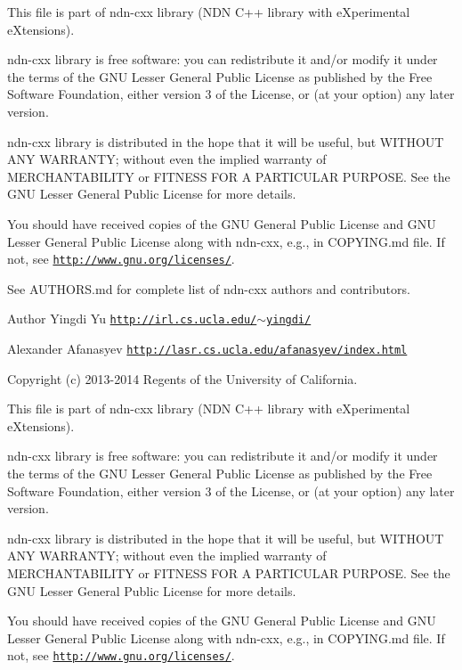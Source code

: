This file is part of ndn-\/cxx library (N\+DN C++ library with e\+Xperimental e\+Xtensions).

ndn-\/cxx library is free software\+: you can redistribute it and/or modify it under the terms of the G\+NU Lesser General Public License as published by the Free Software Foundation, either version 3 of the License, or (at your option) any later version.

ndn-\/cxx library is distributed in the hope that it will be useful, but W\+I\+T\+H\+O\+UT A\+NY W\+A\+R\+R\+A\+N\+TY; without even the implied warranty of M\+E\+R\+C\+H\+A\+N\+T\+A\+B\+I\+L\+I\+TY or F\+I\+T\+N\+E\+SS F\+OR A P\+A\+R\+T\+I\+C\+U\+L\+AR P\+U\+R\+P\+O\+SE. See the G\+NU Lesser General Public License for more details.

You should have received copies of the G\+NU General Public License and G\+NU Lesser General Public License along with ndn-\/cxx, e.\+g., in C\+O\+P\+Y\+I\+N\+G.\+md file. If not, see \href{http://www.gnu.org/licenses/}{\tt http\+://www.\+gnu.\+org/licenses/}.

See A\+U\+T\+H\+O\+R\+S.\+md for complete list of ndn-\/cxx authors and contributors.

\begin{DoxyAuthor}{Author}
Yingdi Yu \href{http://irl.cs.ucla.edu/~yingdi/}{\tt http\+://irl.\+cs.\+ucla.\+edu/$\sim$yingdi/} 

Alexander Afanasyev \href{http://lasr.cs.ucla.edu/afanasyev/index.html}{\tt http\+://lasr.\+cs.\+ucla.\+edu/afanasyev/index.\+html}
\end{DoxyAuthor}
Copyright (c) 2013-\/2014 Regents of the University of California.

This file is part of ndn-\/cxx library (N\+DN C++ library with e\+Xperimental e\+Xtensions).

ndn-\/cxx library is free software\+: you can redistribute it and/or modify it under the terms of the G\+NU Lesser General Public License as published by the Free Software Foundation, either version 3 of the License, or (at your option) any later version.

ndn-\/cxx library is distributed in the hope that it will be useful, but W\+I\+T\+H\+O\+UT A\+NY W\+A\+R\+R\+A\+N\+TY; without even the implied warranty of M\+E\+R\+C\+H\+A\+N\+T\+A\+B\+I\+L\+I\+TY or F\+I\+T\+N\+E\+SS F\+OR A P\+A\+R\+T\+I\+C\+U\+L\+AR P\+U\+R\+P\+O\+SE. See the G\+NU Lesser General Public License for more details.

You should have received copies of the G\+NU General Public License and G\+NU Lesser General Public License along with ndn-\/cxx, e.\+g., in C\+O\+P\+Y\+I\+N\+G.\+md file. If not, see \href{http://www.gnu.org/licenses/}{\tt http\+://www.\+gnu.\+org/licenses/}.

